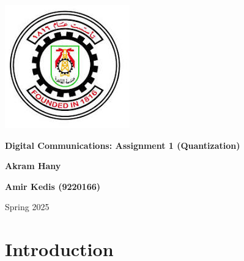 \documentclass{article}
\begin{document}
\begin{titlepage}
\begin{center}
\begin{minipage}[c]{0.15\textwidth}
            \includegraphics[width=\textwidth]{CUFE.jpeg}
        \end{minipage}
    \end{center}
    
    \noindent\hrulefill
    
    \vspace{2cm}
    
    \begin{center}
        {\Huge \textbf{Digital Communications: Assignment 1 (Quantization)}\par}
        \vspace{1.5cm}
        {\Large \textbf{Akram Hany}\par}
        {\Large \textbf{Amir Kedis (9220166)}\par}
        \vspace{1cm}
        {\large Spring 2025\par}
    \end{center}
    
    \vfill
    
\end{titlepage}

\setcounter{chapter}{0}

\section{Introduction}
\end{document}
